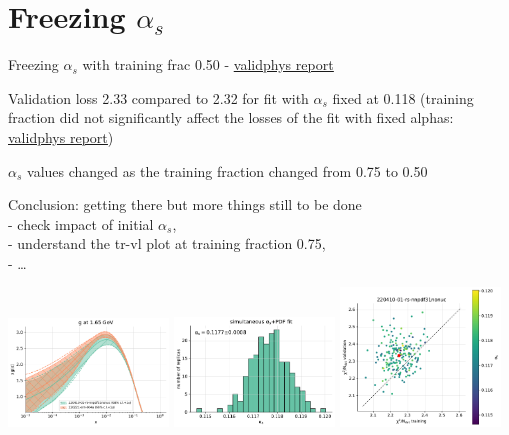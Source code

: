 \documentclass[aspectratio=169,10pt]{beamer}
\begin{document}
\section*{Freezing $\alpha_s$}

\begin{frame}[t]{Freezing $\alpha_s$ with training frac 0.50 - \underline{\href{https://vp.nnpdf.science/UklUxd06R7iHjZULhKPkHQ==/}{validphys report}}}

  Validation loss 2.33 compared to 2.32 for fit with $\alpha_s$ fixed at 0.118 (training fraction did not significantly affect the losses of the fit with fixed alphas: \underline{\href{https://vp.nnpdf.science/K9yvnY0wQGuUSmj2wsRXNQ==/}{validphys report}})\\\vspace*{0.5em}

  $\alpha_s$ values changed as the training fraction changed from 0.75 to 0.50\\\vspace*{0.5em}

  Conclusion: getting there but more things still to be done\\
  - check impact of initial $\alpha_s$, \\
  - understand the tr-vl plot at training fraction 0.75, \\
  - \ldots

  \vspace*{-8.5mm}
  \includegraphics[width=0.32\textwidth]{PDFnormalize0_Basespecs0_PDFscalespecs0_plot_pdfs_g_frac50.pdf}  
  \includegraphics[width=0.32\textwidth]{alphas_hist_frac50.pdf}
  \includegraphics[width=0.32\textwidth]{plot_training_validation_frac50.pdf}

\end{frame}



% 
\end{document}
